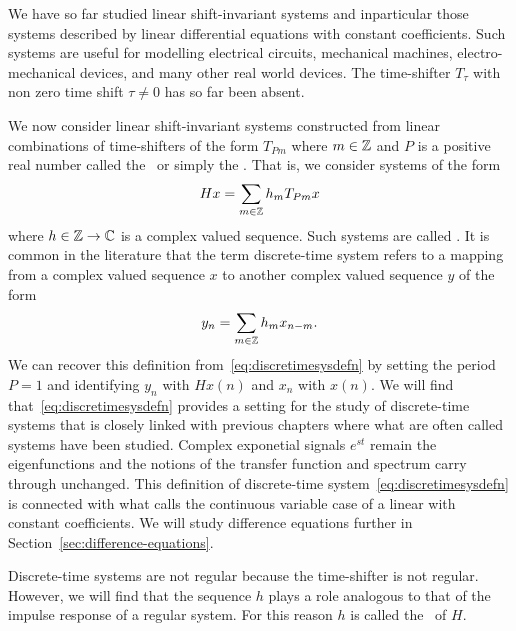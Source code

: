 We have so far studied linear shift-invariant systems and inparticular those systems described by linear differential equations with constant coefficients.  Such systems are useful for modelling electrical circuits, mechanical machines, electro-mechanical devices, and many other real world devices.  %
The time-shifter $T_\tau$ with non zero time shift $\tau \neq 0$ has so far been absent.  %

We now consider linear shift-invariant systems constructed from linear combinations of time-shifters of the form $T_{Pm}$ where $m \in {\mathbb Z}$ and $P$ is a positive real number called the~ or simply the .  That is, we consider systems of the form
\begin{equation}\label{eq:discretimesysdefn}
H x = \sum_{m \in {\mathbb Z}} h_m T_{ P m} x
\end{equation}
where $h \in {\mathbb Z} \to {\mathbb C}$ is a complex valued sequence.  Such systems are called .  It is common in the literature that the term discrete-time system refers to a mapping from a complex valued sequence $x$ to another complex valued sequence $y$ of the form
\[
y_n = \sum_{m \in {\mathbb Z}} h_m x_{n-m}.
\]
We can recover this definition from~\eqref{eq:discretimesysdefn} by setting the period $P = 1$ and identifying $y_n$ with $Hx(n)$ and $x_n$ with $x(n)$.  %
We will find that~\eqref{eq:discretimesysdefn} provides a setting for the study of discrete-time systems that is closely linked with previous chapters where what are often called  systems have been studied.  Complex exponetial signals $e^{st}$ remain the eigenfunctions and the notions of the transfer function and spectrum carry through unchanged.  This definition of discrete-time system~\eqref{eq:discretimesysdefn} is connected with what \citet[Sec.~9.5]{Zemanian_dist_theory_1965} calls the continuous variable case of a linear  with constant coefficients.  We will study difference equations further in Section~\ref{sec:difference-equations}.

Discrete-time systems are not regular because the time-shifter is not regular.  However, we will find that the sequence $h$ plays a role analogous to that of the impulse response of a regular system.  For this reason $h$ is called the~ of $H$.


